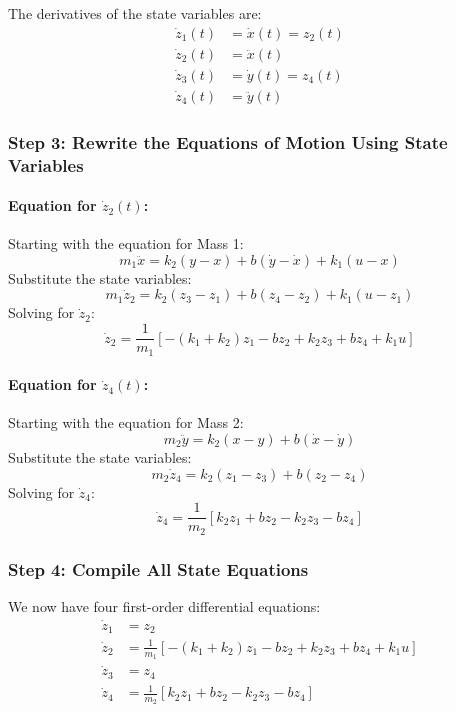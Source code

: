 \documentclass{article}
\begin{document}
The derivatives of the state variables are:
\begin{align*}
\dot{z}_1(t) &= \dot{x}(t) = z_2(t) \\
\dot{z}_2(t) &= \ddot{x}(t) \\
\dot{z}_3(t) &= \dot{y}(t) = z_4(t) \\
\dot{z}_4(t) &= \ddot{y}(t)
\end{align*}

\subsubsection*{Step 3: Rewrite the Equations of Motion Using State Variables}

\paragraph{Equation for \( \dot{z}_2(t) \):}

Starting with the equation for Mass 1:
\[
m_1 \ddot{x} = k_2 (y - x) + b (\dot{y} - \dot{x}) + k_1 (u - x)
\]
Substitute the state variables:
\[
m_1 \dot{z}_2 = k_2 (z_3 - z_1) + b (z_4 - z_2) + k_1 (u - z_1)
\]
Solving for \( \dot{z}_2 \):
\[
\dot{z}_2 = \frac{1}{m_1} \left[ - (k_1 + k_2) z_1 - b z_2 + k_2 z_3 + b z_4 + k_1 u \right]
\]

\paragraph{Equation for \( \dot{z}_4(t) \):}

Starting with the equation for Mass 2:
\[
m_2 \ddot{y} = k_2 (x - y) + b (\dot{x} - \dot{y})
\]
Substitute the state variables:
\[
m_2 \dot{z}_4 = k_2 (z_1 - z_3) + b (z_2 - z_4)
\]
Solving for \( \dot{z}_4 \):
\[
\dot{z}_4 = \frac{1}{m_2} \left[ k_2 z_1 + b z_2 - k_2 z_3 - b z_4 \right]
\]

\subsubsection*{Step 4: Compile All State Equations}

We now have four first-order differential equations:
\begin{align*}
\dot{z}_1 &= z_2 \\
\dot{z}_2 &= \frac{1}{m_1} \left[ - (k_1 + k_2) z_1 - b z_2 + k_2 z_3 + b z_4 + k_1 u \right] \\
\dot{z}_3 &= z_4 \\
\dot{z}_4 &= \frac{1}{m_2} \left[ k_2 z_1 + b z_2 - k_2 z_3 - b z_4 \right]
\end{align*}
\end{document}

